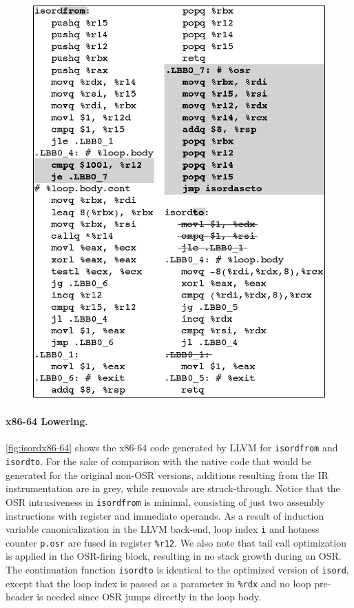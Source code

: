 \ifdefined\noauthorea
\begin{figure}[t]
\begin{center}
\includegraphics[width=0.9\columnwidth]{figures/isordx86-64/isordx86-64.eps}
\caption{\protect}
\end{center}
\end{figure}
\fi

\paragraph{x86-64 Lowering.}
\label{se:ir-x86-lowering}

\myfigure\ref{fig:isordx86-64} shows the x86-64 code generated by LLVM for {\tt isordfrom} and {\tt isordto}. For the sake of comparison with the native code that would be generated for the original non-OSR versions, additions resulting from the IR instrumentation are in grey, while removals are struck-through. Notice that the OSR intrusiveness in {\tt isordfrom} is minimal, consisting of just two assembly instructions with register and immediate operands. As a result of induction variable canonicalization in the LLVM back-end, loop index {\tt i} and hotness counter {\tt p.osr} are fused in register {\tt\%r12}. We also note that tail call optimization is applied in the OSR-firing block, resulting in no stack growth during an OSR. The continuation function {\tt isordto} is identical to the optimized version of {\tt isord}, except that the loop index is passed as a parameter in {\tt \%rdx} and no loop pre-header is needed since OSR jumps directly in the loop body.

